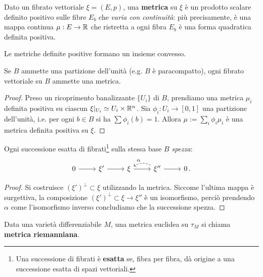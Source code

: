 



\begin{df}
	Dato un fibrato vettoriale $\xi = (E,p)$,
	una \textbf{metrica} su $\xi$ è un prodotto scalare definito positivo
	sulle fibre $E_{b}$ che \emph{varia con continuità}: più precisamente,
	è una mappa continua $\mu:E \to {\mathbb R}$ che ristretta a ogni fibra
	$E_{b}$ è una forma quadratica definita positiva.
\end{df}

\begin{oss}
	Le metriche definite positive formano un insieme convesso.
\end{oss}


\begin{prop}
	Se $B$ ammette una partizione dell'unità (e.g. $B$ è paracompatto),
	ogni fibrato vettoriale su $B$ ammette una metrica.
	\begin{proof}
		Preso un ricoprimento banalizzante $\{U_{i}\}$ di $B$,
prendiamo una metrica $\mu_{i}$ definita positiva
su ciascun $\xi\vert_{U_{i}} \simeq U_{i} \times {\mathbb R}^{n}$.
Sia $\phi_{i}:U_{i}\to [0,1]$ una partizione dell'unità, i.e.
per ogni $b \in B$ si ha $\sum \phi_{i}(b) = 1$.
Allora $\mu := \sum_{i} \phi_{i}\mu_{i}$ è una metrica definita positiva su $\xi$.
	\end{proof}
\end{prop}	


\begin{cor}
	Ogni successione esatta di fibrati\footnote{Una successione di fibrati è \textbf{esatta} se, fibra per fibra, dà origine a una successione esatta di spazi vettoriali.} sulla stessa base $B$  \emph{spezza}:
	\begin{equation*}
		\begin{tikzcd}
			0 \ar[r]
			& \xi' \ar[r]
			& \xi \ar[r]
			& \xi'' \ar[r] \ar[l, bend right, dashed, "\alpha"']
			& 0\,.
		\end{tikzcd}
	\end{equation*}
	\begin{proof}
		Si costruisce $(\xi')^{\perp} \subset \xi$ utilizzando la metrica.
		Siccome l'ultima mappa è surgettiva, la composizione
		$(\xi')^{\perp} \subset \xi \to \xi''$ è un isomorfismo,
		perciò prendendo $\alpha$ come l'isomorfismo inverso
		concludiamo che la successione spezza.
	\end{proof}
\end{cor}

\begin{df}
	Data una varietà differenziabile $M$,
	una metrica euclidea su $\tau_{M}$ si chiama \textbf{metrica riemanniana}.
\end{df}

